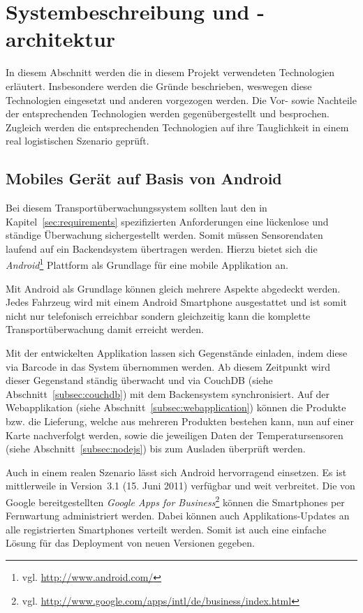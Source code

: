 \section{Systembeschreibung und -architektur}
\label{sec:system}

In diesem Abschnitt werden die in diesem Projekt verwendeten Technologien
	erläutert. Insbesondere werden die Gründe beschrieben, weswegen diese
	Technologien eingesetzt und anderen vorgezogen werden. Die Vor- sowie
	Nachteile der entsprechenden Technologien werden gegenübergestellt und
	besprochen. Zugleich werden die entsprechenden Technologien auf ihre
	Tauglichkeit in einem real logistischen Szenario geprüft.

\subsection{Mobiles Gerät auf Basis von Android}

Bei diesem Transportüberwachungssystem sollten laut den in
	Kapitel~\ref{sec:requirements} spezifizierten Anforderungen eine lückenlose
	und ständige Überwachung sichergestellt werden. Somit müssen Sensorendaten
	laufend auf ein Backendsystem übertragen werden. Hierzu bietet sich
	die \emph{Android}\footnote{vgl. \url{http://www.android.com/}} Plattform
	als Grundlage für eine mobile Applikation an.
	
Mit Android als Grundlage können gleich mehrere Aspekte abgedeckt werden. Jedes
	Fahrzeug wird mit einem Android Smartphone ausgestattet und ist somit nicht
	nur telefonisch erreichbar sondern gleichzeitig kann die komplette
	Transportüberwachung damit erreicht werden.
	
Mit der entwickelten Applikation lassen sich Gegenstände einladen, indem diese
	via Barcode in das System übernommen werden. Ab diesem Zeitpunkt wird dieser
	Gegenstand ständig überwacht und via CouchDB (siehe Abschnitt~\ref{subsec:couchdb})
	mit dem Backensystem synchronisiert. Auf der Webapplikation (siehe
	Abschnitt~\ref{subsec:webapplication}) können die Produkte bzw. die Lieferung,
	welche aus mehreren Produkten bestehen kann, nun auf einer Karte
	nachverfolgt werden, sowie die jeweiligen Daten der Temperatursensoren
	(siehe Abschnitt~\ref{subsec:nodejs}) bis zum Ausladen überprüft werden.
		
Auch in einem realen Szenario lässt sich Android hervorragend einsetzen. Es ist
	mittlerweile in Version~3.1 (15. Juni 2011) verfügbar und weit verbreitet.
	Die von Google bereitgestellten \emph{Google Apps for Business}\footnote{vgl.
	\url{http://www.google.com/apps/intl/de/business/index.html}} können die
	Smartphones per Fernwartung administriert werden. Dabei können auch
	Applikations-Updates an alle registrierten Smartphones verteilt werden.
	Somit ist auch eine einfache Lösung für das Deployment von neuen Versionen
	gegeben.
	
